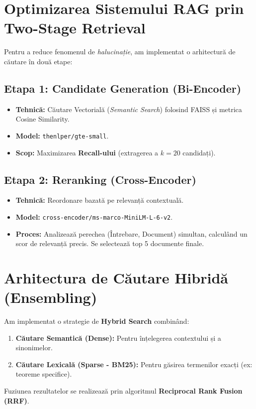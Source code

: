 \documentclass[12pt,a4paper]{report}
\begin{document}
\section{Optimizarea Sistemului RAG prin Two-Stage Retrieval}

Pentru a reduce fenomenul de \textit{halucinație}, am implementat o arhitectură de căutare în două etape:

\subsection{Etapa 1: Candidate Generation (Bi-Encoder)}
\begin{itemize}
    \item \textbf{Tehnică:} Căutare Vectorială (\textit{Semantic Search}) folosind FAISS și metrica Cosine Similarity.
    \item \textbf{Model:} \texttt{thenlper/gte-small}.
    \item \textbf{Scop:} Maximizarea \textbf{Recall-ului} (extragerea a $k=20$ candidați).
\end{itemize}

\subsection{Etapa 2: Reranking (Cross-Encoder)}
\begin{itemize}
    \item \textbf{Tehnică:} Reordonare bazată pe relevanță contextuală.
    \item \textbf{Model:} \texttt{cross-encoder/ms-marco-MiniLM-L-6-v2}.
    \item \textbf{Proces:} Analizează perechea (Întrebare, Document) simultan, calculând un scor de relevanță precis. Se selectează top 5 documente finale.
\end{itemize}

\section{Arhitectura de Căutare Hibridă (Ensembling)}
Am implementat o strategie de \textbf{Hybrid Search} combinând:
\begin{enumerate}
    \item \textbf{Căutare Semantică (Dense):} Pentru înțelegerea contextului și a sinonimelor.
    \item \textbf{Căutare Lexicală (Sparse - BM25):} Pentru găsirea termenilor exacți (ex: teoreme specifice).
\end{enumerate}
Fuziunea rezultatelor se realizează prin algoritmul \textbf{Reciprocal Rank Fusion (RRF)}.
\end{document}
